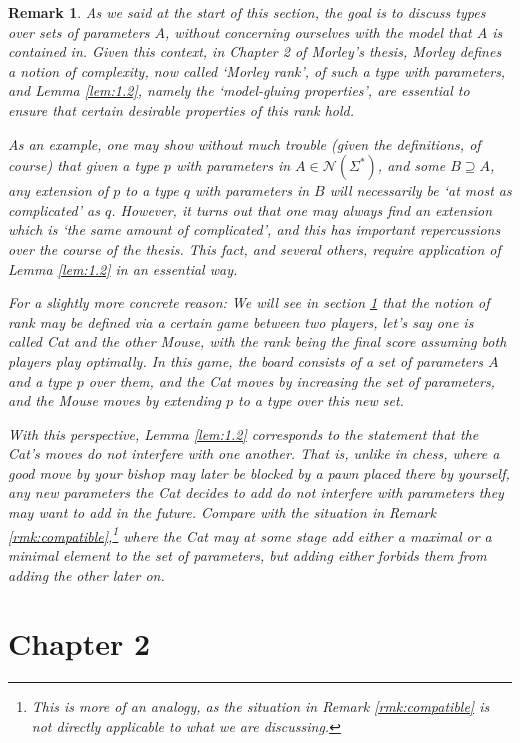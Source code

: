 \documentclass{article}
\newtheorem{remark}[theorem]{Remark}
\theoremstyle{nonumberplain}
\newcommand{\calN}{\mathcal{N}}
\begin{document}
\begin{remark}
As we said at the start of this section, the goal is to discuss types over sets of parameters $A$, without concerning ourselves with the model that $A$ is contained in. Given this context, in Chapter 2 of Morley's thesis, Morley defines a notion of complexity, now called `Morley rank', of such a type with parameters, and Lemma \ref{lem:1.2}, namely the `model-gluing properties', are essential to ensure that certain desirable properties of this rank hold.

As an example, one may show without much trouble (given the definitions, of course) that given a type $p$ with parameters in $A \in \calN(\Sigma^*)$, and some $B \supseteq A$, any extension of $p$ to a type $q$ with parameters in $B$ will necessarily be `at most as complicated' as $q$. However, it turns out that one may always find an extension which is `the same amount of complicated', and this has important repercussions over the course of the thesis. This fact, and several others, require application of Lemma \ref{lem:1.2} in an essential way.

For a slightly more concrete reason: We will see in section \ref{sec:ch2} that the notion of rank may be defined via a certain game between two players, let's say one is called Cat and the other Mouse, with the rank being the final score assuming both players play optimally. In this game, the board consists of a set of parameters $A$ and a type $p$ over them, and the Cat moves by increasing the set of parameters, and the Mouse moves by extending $p$ to a type over this new set.

With this perspective, Lemma \ref{lem:1.2} corresponds to the statement that the Cat's moves do not interfere with one another. That is, unlike in chess, where a good move by your bishop may later be blocked by a pawn placed there by yourself, any new parameters the Cat decides to add do not interfere with parameters they may want to add in the future. Compare with the situation in Remark \ref{rmk:compatible},\footnote{This is more of an analogy, as the situation in Remark \ref{rmk:compatible} is not directly applicable to what we are discussing.} where the Cat may at some stage add either a maximal or a minimal element to the set of parameters, but adding either forbids them from adding the other later on.
\end{remark}

\section{Chapter 2}\label{sec:ch2}
\end{document}

